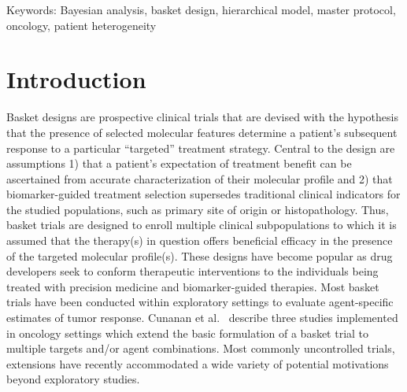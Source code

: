 Keywords: Bayesian analysis, basket design, hierarchical model, master protocol, oncology, patient heterogeneity

\section{Introduction}

Basket designs are prospective clinical trials that are devised with the hypothesis that the presence of selected molecular features determine a patient's subsequent response to a particular ``targeted'' treatment strategy. Central to the design are assumptions 1) that a patient's expectation of treatment benefit can be ascertained from accurate characterization of their molecular profile and 2) that biomarker-guided treatment selection supersedes traditional clinical indicators for the studied populations, such as primary site of origin or histopathology. Thus, basket trials are designed to enroll multiple clinical subpopulations to which it is assumed that the therapy(s) in question offers beneficial efficacy in the presence of the targeted molecular profile(s). %
These designs have become popular as drug developers seek to conform therapeutic interventions to the individuals being treated with precision medicine and biomarker-guided therapies.
Most basket trials have been conducted within exploratory settings to evaluate agent-specific estimates of tumor response. Cunanan et al.\ \citep{doi:10.1200/JCO.2016.69.9751} describe three studies implemented in oncology settings which extend the basic formulation of a basket trial to multiple targets and/or agent combinations. Most commonly uncontrolled trials, extensions have recently accommodated a wide variety of potential motivations beyond exploratory studies. 

